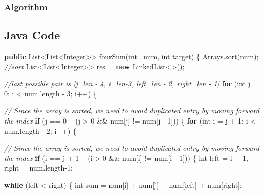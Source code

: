 \documentclass[]{book}
\newenvironment{Shaded}{\begin{snugshade}}{\end{snugshade}}
\newcommand{\BuiltInTok}[1]{#1}
\newcommand{\CommentTok}[1]{\textcolor[rgb]{0.56,0.35,0.01}{\textit{#1}}}
\newcommand{\DataTypeTok}[1]{\textcolor[rgb]{0.13,0.29,0.53}{#1}}
\newcommand{\DecValTok}[1]{\textcolor[rgb]{0.00,0.00,0.81}{#1}}
\newcommand{\FunctionTok}[1]{\textcolor[rgb]{0.00,0.00,0.00}{#1}}
\newcommand{\KeywordTok}[1]{\textcolor[rgb]{0.13,0.29,0.53}{\textbf{#1}}}
\newcommand{\NormalTok}[1]{#1}
\begin{document}
\hypertarget{algorithm-7}{%
\subsubsection{Algorithm}\label{algorithm-7}}

\hypertarget{java-code-5}{%
\subsection{Java Code}\label{java-code-5}}

\begin{Shaded}
\begin{Highlighting}[]
\KeywordTok{public} \BuiltInTok{List}\NormalTok{<}\BuiltInTok{List}\NormalTok{<}\BuiltInTok{Integer}\NormalTok{>> }\FunctionTok{fourSum}\NormalTok{(}\DataTypeTok{int}\NormalTok{[] num, }\DataTypeTok{int}\NormalTok{ target) \{}
    \BuiltInTok{Arrays}\NormalTok{.}\FunctionTok{sort}\NormalTok{(num); }\CommentTok{//sort}
    \BuiltInTok{List}\NormalTok{<}\BuiltInTok{List}\NormalTok{<}\BuiltInTok{Integer}\NormalTok{>> res = }\KeywordTok{new} \BuiltInTok{LinkedList}\NormalTok{<>();}

    \CommentTok{//last possible pair is [j=len - 4, i=len-3, left=len - 2, right=len - 1]}
    \KeywordTok{for}\NormalTok{ (}\DataTypeTok{int}\NormalTok{ j = }\DecValTok{0}\NormalTok{; i < num.}\FunctionTok{length}\NormalTok{ - }\DecValTok{3}\NormalTok{; i++) \{}

        \CommentTok{// Since the array is sorted, we need to avoid duplicated entry by moving forward the index}
        \KeywordTok{if}\NormalTok{ (j == }\DecValTok{0}\NormalTok{ || (j > }\DecValTok{0}\NormalTok{ && num[j] != num[j - }\DecValTok{1}\NormalTok{])) \{}
            \KeywordTok{for}\NormalTok{ (}\DataTypeTok{int}\NormalTok{ i = j + }\DecValTok{1}\NormalTok{; i < num.}\FunctionTok{length}\NormalTok{ - }\DecValTok{2}\NormalTok{; i++) \{}

                \CommentTok{// Since the array is sorted, we need to avoid duplicated entry by moving forward the index}
                \KeywordTok{if}\NormalTok{ (i == j + }\DecValTok{1}\NormalTok{ || (i > }\DecValTok{0}\NormalTok{ && num[i] != num[i - }\DecValTok{1}\NormalTok{])) \{}
                    \DataTypeTok{int}\NormalTok{ left = i + }\DecValTok{1}\NormalTok{, right = num.}\FunctionTok{length}\DecValTok{-1}\NormalTok{;}

                    \KeywordTok{while}\NormalTok{ (left < right) \{}
                        \DataTypeTok{int}\NormalTok{ sum = num[i] + num[j] + num[left] + num[right];}


\end{Highlighting}
\end{Shaded}
\end{document}
